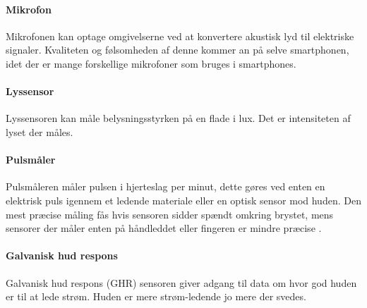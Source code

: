 \paragraph{Mikrofon}
Mikrofonen kan optage omgivelserne ved at konvertere akustisk lyd til elektriske signaler. Kvaliteten og følsomheden af denne kommer an på selve smartphonen, idet der er mange forskellige mikrofoner som bruges i smartphones. 

\paragraph{Lyssensor}
Lyssensoren kan måle belysningsstyrken på en flade i lux. Det er intensiteten af lyset der måles.

\paragraph{Pulsmåler}
Pulsmåleren måler pulsen i hjerteslag per minut, dette gøres ved enten en elektrisk puls igennem et ledende materiale eller en optisk sensor mod huden.
Den mest præcise måling fås hvis sensoren sidder spændt omkring brystet, mens sensorer der måler enten på håndleddet eller fingeren er mindre præcise \citep{burke1998precision}.

\paragraph{Galvanisk hud respons}
Galvanisk hud respons (GHR) sensoren giver adgang til data om hvor god huden er til at lede strøm.
Huden er mere strøm-ledende jo mere der svedes.
